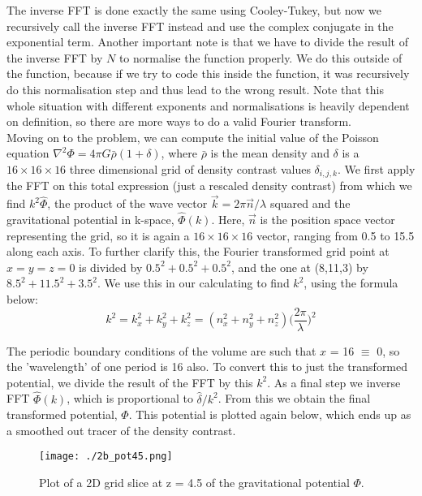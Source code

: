 The inverse FFT is done exactly the same using Cooley-Tukey, but now we recursively call the inverse FFT instead and use the complex conjugate in the exponential term. Another important note is that we have to divide the result of the inverse FFT by $N$ to normalise the function properly. We do this outside of the function, because if we try to code this inside the function, it was recursively do this normalisation step and thus lead to the wrong result. Note that this whole situation with different exponents and normalisations is heavily dependent on definition, so there are  more ways to do a valid Fourier transform.\\

Moving on to the problem, we can compute the initial value of the Poisson equation $\nabla^2 \Phi = 4\pi G \bar{\rho} (1 + \delta)$, where $\bar{\rho}$ is the mean density and $\delta$ is a $16 \times 16 \times 16$ three dimensional grid of density contrast values $\delta_{i,j,k}$. We first apply the FFT on this total expression (just a rescaled density contrast) from which we find $k^2 \hat{\Phi}$, the product of the wave vector $\vec{k} = 2\pi \vec{n}/\lambda$ squared and the gravitational potential in k-space, $\hat{\Phi}(k)$. Here, $\vec{n}$ is the position space vector representing the grid, so it is again a $16 \times 16 \times 16$ vector, ranging from 0.5 to 15.5 along each axis. To further clarify this, the Fourier transformed grid point at $x =y = z = 0$ is divided by $0.5^2 + 0.5^2 +0.5^2$, and the one at (8,11,3) by $8.5^2 + 11.5^2 +3.5^2$. We use this in our calculating to find $k^2$, using the formula below:\\

\begin{equation}
k^2 = k_x^2 + k_y^2 + k_z^2 = (n_x^2 + n_y^2 + n_z^2) \Big(\frac{2\pi}{\lambda}\Big)^2
\end{equation}

The periodic boundary conditions of the volume are such that $x$ = 16 $\equiv$ 0, so the 'wavelength' of one period is 16 also. To convert this to just the transformed potential, we divide the result of the FFT by this $k^2$. As a final step we inverse FFT $\hat{\Phi}(k)$, which is proportional to $\hat{\delta}/k^2$. From this we obtain the final transformed potential, $\Phi$. This potential is plotted again below, which ends up as a smoothed out tracer of the density contrast.\\


\begin{figure}[h!]
  \centering
  \texttt{[image: ./2b\_pot45.png]}
  \caption{Plot of a 2D grid slice at z = 4.5 of the gravitational potential $\Phi$.}
\end{figure}

